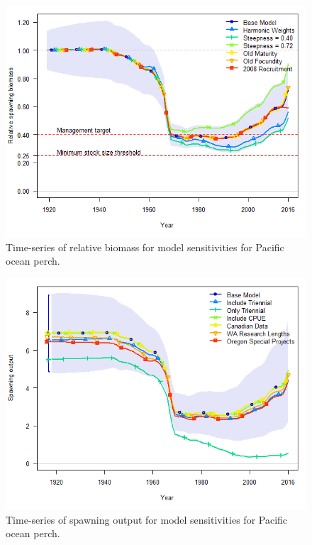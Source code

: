 \documentclass[12pt,]{article}
\begin{document}
\FloatBarrier

\begin{figure}
\centering
\includegraphics{Figures/depl_sens1.png}
\caption{Time-series of relative biomass for model sensitivities for
Pacific ocean perch. \label{fig:sens1_depl}}
\end{figure}

\FloatBarrier

\begin{figure}
\centering
\includegraphics{Figures/ssb_sens2.png}
\caption{Time-series of spawning output for model sensitivities for
Pacific ocean perch. \label{fig:sens2_ssb}}
\end{figure}
\end{document}
